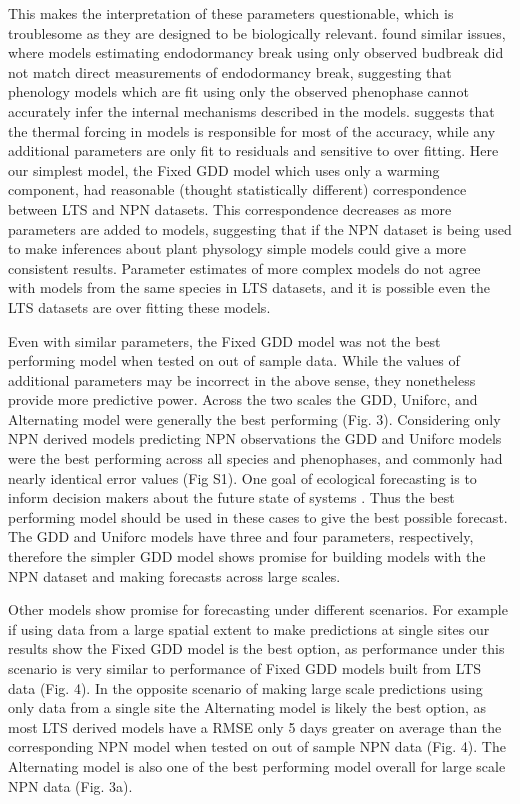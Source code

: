 \documentclass[fleqn,10pt,lineno]{wlpeerj} %
\begin{document}
This makes the interpretation of these parameters questionable, which is troublesome as they are designed to be biologically relevant. \cite{chuine2016} found similar issues, where models estimating endodormancy break using only observed budbreak did not match direct measurements of endodormancy break, suggesting that phenology models which are fit using only the observed phenophase cannot accurately infer the internal mechanisms described in the models. \cite{basler2016} suggests that the thermal forcing in models is responsible for most of the accuracy, while any additional parameters are only fit to residuals and sensitive to over fitting. Here our simplest model, the Fixed GDD model which uses only a warming component, had reasonable (thought statistically different) correspondence between LTS and NPN datasets. This correspondence decreases as more parameters are added to models, suggesting that if the NPN dataset is being used to make inferences about plant physology simple models could give a more consistent results. Parameter estimates of more complex models do not agree with models from the same species in LTS datasets, and it is possible even the LTS datasets are over fitting these models. 

Even with similar parameters, the Fixed GDD model was not the best performing model when tested on out of sample data. While the values of additional parameters may be incorrect in the above sense, they nonetheless provide more predictive power. Across the two scales the GDD, Uniforc, and Alternating model were generally the best performing (Fig. 3). Considering only NPN derived models predicting NPN observations the GDD and Uniforc models were the best performing across all species and phenophases, and commonly had nearly identical error values (Fig S1). One goal of ecological forecasting is to inform decision makers about the future state of systems \citep{dietz2017}. Thus the best performing model should be used in these cases to give the best possible forecast. The GDD and Uniforc models have three and four parameters, respectively, therefore the simpler GDD model shows promise for building models with the NPN dataset and making forecasts across large scales.

Other models show promise for forecasting under different scenarios. For example if using data from a large spatial extent to make predictions at single sites our results show the Fixed GDD model is the best option, as performance under this scenario is very similar to performance of Fixed GDD models built from LTS data (Fig. 4). In the opposite scenario of making large scale predictions using only data from a single site the Alternating model is likely the best option, as most LTS derived models have a RMSE only 5 days greater on average than the corresponding NPN model when tested on out of sample NPN data (Fig. 4). The Alternating model is also one of the best performing model overall for large scale NPN data (Fig. 3a). 
\end{document}
